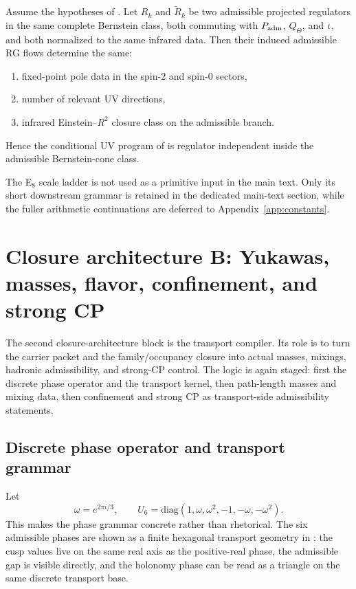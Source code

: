 \begin{theorem}
\label{thm:regulator-equivalence-bernstein-cone}
Assume the hypotheses of . Let $R_k$ and
$\widetilde R_k$ be two admissible projected regulators in the same complete Bernstein class,
both commuting with $P_{\mathrm{adm}}$, $Q_\Theta$, and $\iota$, and both normalized to the same infrared
data. Then their induced admissible RG flows determine the same:
\begin{enumerate}[label=(\roman*), leftmargin=1.5em, topsep=3pt, itemsep=2pt]
    \item fixed-point pole data in the spin-$2$ and spin-$0$ sectors,
    \item number of relevant UV directions,
    \item infrared Einstein--$R^2$ closure class on the admissible branch.
\end{enumerate}
Hence the conditional UV program of  is regulator
independent inside the admissible Bernstein-cone class.
\end{theorem}

The E$_8$ scale ladder is not used as a primitive input in the main text. Only its short downstream grammar is retained in the dedicated main-text section, while the fuller arithmetic continuations are deferred to Appendix~\ref{app:constants}.

\section{Closure architecture B: Yukawas, masses, flavor, confinement, and strong CP}

The second closure-architecture block is the transport compiler. Its role is to turn the carrier packet and the family/occupancy closure into actual masses, mixings, hadronic admissibility, and strong-CP control. The logic is again staged: first the discrete phase operator and the transport kernel, then path-length masses and mixing data, then confinement and strong CP as transport-side admissibility statements.

\subsection{Discrete phase operator and transport grammar}

Let
\[
\omega=e^{2\pi i/3},
\qquad
U_6=\mathrm{diag}(1,\omega,\omega^2,-1,-\omega,-\omega^2).
\]
This makes the phase grammar concrete rather than rhetorical. The six admissible phases are shown as a finite hexagonal transport geometry in : the cusp values live on the same real axis as the positive-real phase, the admissible gap is visible directly, and the holonomy phase can be read as a triangle on the same discrete transport base.

